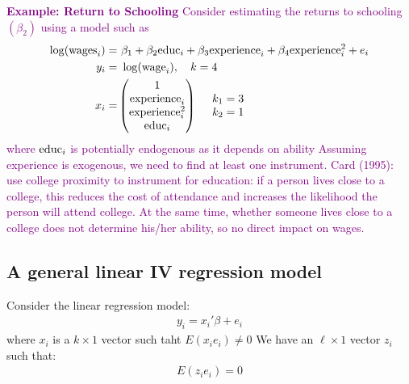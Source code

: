 \documentclass[a4paper,twoside,11pt]{article}
\begin{document}
\textcolor{Purple}{
\textbf{Example: Return to Schooling}
\newline
\newline
Consider estimating the returns to schooling $(\beta_2)$ using a model such as 
\begin{equation*}
\begin{aligned}
\log (\textmd{wages}_i) =& \  \beta_1 + \beta_2 \textmd{educ}_i + \beta_3 \textmd{experience}_i + \beta_4 \textmd{experience}_i^2 + e_i \\
y_i =& \ \log (\textmd{wage}_i) , \ \ \ k=4 \\
x_i =& \begin{pmatrix}
1 \\
\textmd{experience}_i \\
\textmd{experience}_i^2 \\
\textmd{educ}_i
\end{pmatrix} \ \ \ \ \begin{matrix}
k_1 =3 \\
k_2 =1
\end{matrix}
\end{aligned} 
\end{equation*}
where $\textmd{educ}_i$ is potentially endogenous as it depends on ability
\newline
\newline
Assuming experience is exogenous, we need to find at least one instrument.
\newline
\newline
Card (1995): use college proximity to instrument for education: if a
person lives close to a college, this reduces the cost of attendance and increases the likelihood the person will attend college. At the same time, whether someone lives close to a college does not determine his/her ability, so no direct impact on wages.}
\subsection{A general linear IV regression model}
Consider the linear regression model:
\begin{equation*}
\begin{aligned}
y_i = x_i' \beta + e_i
\end{aligned} 
\end{equation*}
where $x_i$ is a $k \times 1$ vector such taht $E(x_ie_i)\ne 0$ 
\newline
\newline
We have an $\ell \times 1$ vector $z_i$ such that:
\begin{equation*}
\begin{aligned}
E(z_i e_i) =0 
\end{aligned} 
\end{equation*}
\end{document}
